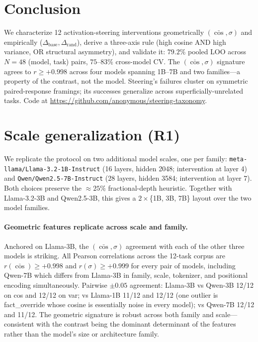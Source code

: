 \documentclass[11pt]{article}
\begin{document}
\section{Conclusion}

We characterize 12 activation-steering interventions geometrically
$(\bar{\cos}, \sigma)$ and empirically
($\Delta_{\text{base}}, \Delta_{\text{rand}}$), derive a three-axis
rule (high cosine AND high variance, OR structural asymmetry), and
validate it: $79.2\%$ pooled LOO across $N{=}48$ (model, task)
pairs, $75$--$83\%$ cross-model CV. The $(\bar{\cos}, \sigma)$
signature agrees to $r \geq +0.998$ across four models spanning
1B--7B and two families---a property of the contrast, not the
model. Steering's failures cluster on symmetric paired-response
framings; its successes generalize across superficially-unrelated
tasks. Code at
\url{https://github.com/anonymous/steering-taxonomy}.



\appendix
\section{Scale generalization (R1)}
\label{app:scale}

We replicate the protocol on two additional model scales, one per
family: \texttt{meta-llama/Llama-3.2-1B-Instruct} (16 layers,
hidden 2048; intervention at layer 4) and
\texttt{Qwen/Qwen2.5-7B-Instruct} (28 layers, hidden 3584;
intervention at layer 7). Both choices preserve the $\approx 25\%$
fractional-depth heuristic. Together with Llama-3.2-3B and
Qwen2.5-3B, this gives a $2 \times$\{1B, 3B, 7B\} layout over the
two model families.

\paragraph{Geometric features replicate across scale and family.}
Anchored on Llama-3B, the $(\bar{\cos}, \sigma)$ agreement with each
of the other three models is striking. All Pearson correlations
across the 12-task corpus are $r(\bar{\cos}) \geq +0.998$ and
$r(\sigma) \geq +0.999$ for every pair of models, including
Qwen-7B which differs from Llama-3B in family, scale, tokenizer,
and positional encoding simultaneously. Pairwise $\pm 0.05$
agreement: Llama-3B vs Qwen-3B 12/12 on cos and 12/12 on var;
vs Llama-1B 11/12 and 12/12 (one outlier is fact\_override whose
cosine is essentially noise in every model); vs Qwen-7B 12/12 and
11/12. The geometric signature is robust across both family and
scale---consistent with the contrast being the dominant determinant
of the features rather than the model's size or architecture family.
\end{document}
